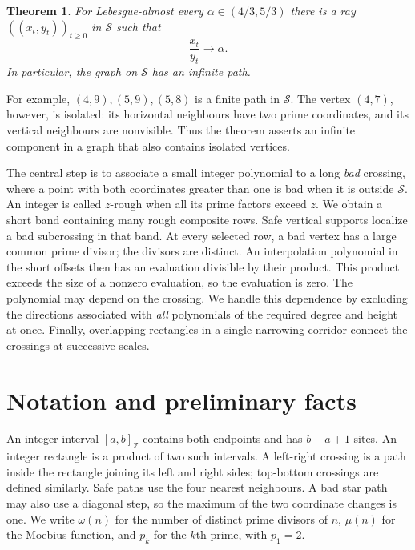 \documentclass[11pt]{article}
\newtheorem{theorem}{Theorem}[section]
\theoremstyle{definition}
\theoremstyle{remark}
\newcommand{\ZZ}{\mathbb Z}
\newcommand{\cS}{\mathcal S}
\begin{document}
\begin{theorem}\label{thm:directions}
For Lebesgue-almost every $\alpha\in(4/3,5/3)$ there is a ray
$((x_t,y_t))_{t\geq0}$ in $\cS$ such that
\[
                         \frac{x_t}{y_t}\longrightarrow\alpha.
\]
In particular, the graph on $\cS$ has an infinite path.
\end{theorem}

For example, $(4,9),(5,9),(5,8)$ is a finite path in $\cS$.
The vertex $(4,7)$, however, is isolated: its horizontal neighbours have two
prime coordinates, and its vertical neighbours are nonvisible. Thus the
theorem asserts an infinite component in a graph that also contains
isolated vertices.

The central step is to associate a small integer polynomial to a long
\emph{bad} crossing, where a point with both coordinates greater than one
is bad when it is outside $\cS$. An integer is called $z$-rough when all
its prime factors exceed $z$. We obtain a short band containing many
rough composite rows. Safe vertical supports localize a bad subcrossing
in that band. At every selected row, a bad vertex has a large common prime
divisor; the divisors are distinct. An interpolation polynomial in the
short offsets then has an evaluation divisible by their product. This
product exceeds the size of a nonzero evaluation, so the evaluation is zero.
The polynomial may depend on the crossing. We handle this dependence by
excluding the directions associated with \emph{all} polynomials of the
required degree and height at once. Finally, overlapping rectangles in a
single narrowing corridor connect the crossings at successive scales.

\section{Notation and preliminary facts}

An integer interval $[a,b]_{\ZZ}$ contains both endpoints and has
$b-a+1$ sites. An integer rectangle is a product of two such intervals.
A left-right crossing is a path inside the rectangle joining its left and
right sides; top-bottom crossings are defined similarly. Safe paths use
the four nearest neighbours. A bad star path may also use a diagonal step,
so the maximum of the two coordinate changes is one.
We write $\omega(n)$ for the number of distinct prime divisors of $n$,
$\mu(n)$ for the Moebius function, and $p_k$ for the $k$th prime,
with $p_1=2$.
\end{document}

